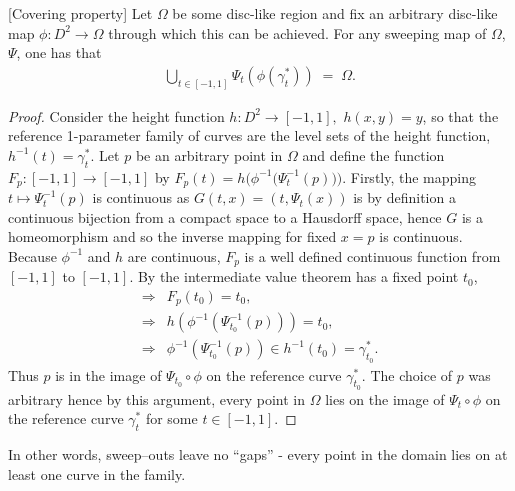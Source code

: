 \begin{lemma}\label{lem:sweep-is-surj}[Covering property]
Let $\Omega$ be some disc-like region and fix an arbitrary disc-like map $\phi:D^2\to \Omega$ through which this can be achieved. For any sweeping map of $\Omega$, $\Psi$, one has that
\begin{align*}
\bigcup_{t\in[-1,1]} \Psi_t(\phi(\gamma_t^*)) \;=\; \Omega .
\end{align*}
\end{lemma}
\begin{proof}
Consider the height function $h:D^2\to[-1,1],$  $h(x,y) = y$, so that the reference 1-parameter family of curves are the level sets of the height function, $h^{-1}(t) = \gamma_t^*$. Let $p$ be an arbitrary point in $\Omega$ and define the function $F_p:[-1,1]\to [-1,1]$ by $F_p(t) = h\big(\phi^{-1}\big(\Psi_t^{-1}(p)\big)\big)$. Firstly, the mapping $t \mapsto \Psi_t^{-1}(p)$ is continuous as $G(t,x) = (t,\Psi_t(x))$ is by definition a continuous bijection from a compact space to a Hausdorff space, hence $G$ is a homeomorphism and so the inverse mapping for fixed $x=p$ is continuous. Because $\phi^{-1}$ and $h$ are continuous, $F_p$ is a well defined continuous function from $[-1,1]$ to $[-1,1]$. By the intermediate value theorem has a fixed point $t_0$, 
\begin{align*}
\Rightarrow& F_p(t_0)=t_0, \\
\Rightarrow& h(\phi^{-1}(\Psi_{t_0}^{-1}(p)))=t_0, \\
\Rightarrow& \phi^{-1}(\Psi_{t_0}^{-1}(p))\in h^{-1}(t_0) = \gamma_{t_0}^{*}.
\end{align*}
Thus $p$ is in the image of $\Psi_{t_0} \circ \phi$ on the reference curve $\gamma_{t_0}^*$. The choice of $p$ was arbitrary hence by this argument, every point in $\Omega$ lies on the image of $\Psi_{t} \circ \phi$ on the reference curve $\gamma_t^*$ for some $t \in [-1,1]$.
\end{proof}
\begin{remark}
    In other words, sweep--outs leave no “gaps” - every point in the domain lies on at least one curve in the family.
\end{remark}

